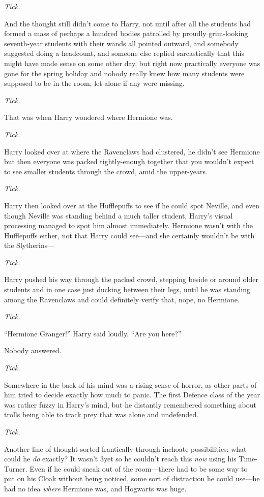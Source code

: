 \emph{Tick.}

And the thought still didn’t come to Harry, not until after all the students had formed a mass of perhaps a hundred bodies patrolled by proudly grim-looking seventh-year students with their wands all pointed outward, and somebody suggested doing a headcount, and someone else replied sarcastically that this might have made sense on some other day, but right now practically everyone was gone for the spring holiday and nobody really knew how many students were supposed to be in the room, let alone if any were missing.

\emph{Tick.}

That was when Harry wondered where Hermione was.

\emph{Tick.}

Harry looked over at where the Ravenclaws had clustered, he didn’t see Hermione but then everyone was packed tightly-enough together that you wouldn’t expect to see smaller students through the crowd, amid the upper-years.

\emph{Tick.}

Harry then looked over at the Hufflepuffs to see if he could spot Neville, and even though Neville was standing behind a much taller student, Harry’s visual processing managed to spot him almost immediately. Hermione wasn’t with the Hufflepuffs either, not that Harry could see—and she certainly wouldn’t be with the Slytherins—

\emph{Tick.}

Harry pushed his way through the packed crowd, stepping beside or around older students and in one case just ducking between their legs, until he was standing among the Ravenclaws and could definitely verify that, nope, no Hermione.

\emph{Tick.}

“Hermione Granger!” Harry said loudly. “Are you here?”

Nobody answered.

\emph{Tick.}

Somewhere in the back of his mind was a rising sense of horror, as other parts of him tried to decide exactly how much to panic. The first Defence class of the year was rather fuzzy in Harry’s mind, but he distantly remembered something about trolls being able to track prey that was alone and undefended.

\emph{Tick.}

Another line of thought sorted frantically through inchoate possibilities; what could he \emph{do} exactly? It wasn’t 3\pm yet so he couldn’t reach this \emph{now} using his Time-Turner. Even if he could sneak out of the room—there had to be some way to put on his Cloak without being noticed, some sort of distraction he could use—he had no idea \emph{where} Hermione was, and Hogwarts was huge.

